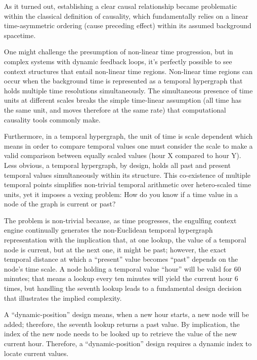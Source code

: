 \documentclass{article}
\begin{document}
As it turned out, establishing a clear causal relationship became problematic within the classical definition of causality, which fundamentally relies on a linear time-asymmetric ordering (cause preceding effect) within its assumed background spacetime.

One might challenge the presumption of non-linear time progression, but in complex systems with dynamic feedback loops, it’s perfectly possible to see context structures that entail non-linear time regions. Non-linear time regions can occur when the background time is represented as a temporal hypergraph that holds multiple time resolutions simultaneously. The simultaneous presence of time units at different scales breaks the simple time-linear assumption (all time has the same unit, and moves therefore at the same rate) that computational causality tools commonly make.

Furthermore, in a temporal hypergraph, the unit of time is scale dependent which means in order to compare temporal values one must consider the scale to make a valid comparison between equally scaled values (hour X compared to hour Y). Less obvious, a temporal hypergraph, by design, holds all past and present temporal values simultaneously within its structure. This co-existence of multiple temporal points simplifies non-trivial temporal arithmetic over hetero-scaled time units, yet it imposes a vexing problem: How do you know if a time value in a node of the graph is current or past?

The problem is non-trivial because, as time progresses, the engulfing context engine continually generates the non-Euclidean temporal hypergraph representation with the implication that, at one lookup, the value of a temporal node is current, but at the next one, it might be past; however, the exact temporal distance at which a “present” value becomes “past” depends on the node's time scale. A node holding a temporal value “hour” will be valid for 60 minutes; that means a lookup every ten minutes will yield the current hour 6 times, but handling the seventh lookup leads to a fundamental design decision that illustrates the implied complexity.

A “dynamic-position” design means, when a new hour starts, a new node will be added; therefore, the seventh lookup returns a past value. By implication, the index of the new node needs to be looked up to retrieve the value of the new current hour. Therefore, a “dynamic-position” design requires a dynamic index to locate current values.
\end{document}
